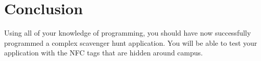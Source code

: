 \section{Conclusion}
Using all of your knowledge of programming, you should have now successfully programmed a complex scavenger hunt application.
You will be able to test your application with the NFC tags that are hidden around campus.
